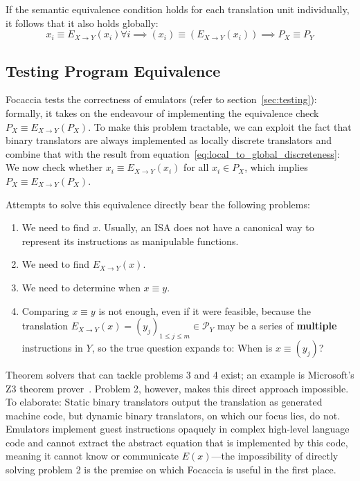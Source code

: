 If the semantic equivalence condition holds for each translation unit individually, it follows that it also holds globally:
\begin{equation}\label{eq:local_to_global_discreteness}
    x_i \equiv E_{X\rightarrow Y}(x_i) \forall i \implies (x_i) \equiv (E_{X\rightarrow Y}(x_i)) \implies P_X \equiv P_Y
\end{equation}

\subsection{Testing Program Equivalence}\label{sec:program_equiv}

Focaccia tests the correctness of emulators (refer to section~\ref{sec:testing}): formally, it takes on the endeavour of
implementing the equivalence check $P_X \equiv E_{X \rightarrow Y}(P_X)$. To make this problem tractable, we can exploit
the fact that binary translators are always implemented as locally discrete translators and combine that with the result
from equation~\ref{eq:local_to_global_discreteness}: We now check whether $x_i \equiv E_{X \rightarrow Y}(x_i)$ for all
$x_i \in P_X$, which implies $P_X \equiv E_{X \rightarrow Y}(P_X)$.

Attempts to solve this equivalence directly bear the following problems:

\begin{enumerate}
    \item We need to find $x$. Usually, an \ac{ISA} does not have a canonical way to represent its instructions as
        manipulable functions.
    \item We need to find $E_{X \rightarrow Y}(x)$.
    \item We need to determine when $x \equiv y$.
    \item Comparing $x \equiv y$ is not enough, even if it were feasible, because the translation $E_{X \rightarrow
        Y}(x) = (y_j)_{1 \leq j \leq m} \in \mathcal{P}_Y$ may be a series of \textbf{multiple} instructions in $Y$, so
        the true question expands to: When is $x \equiv (y_j)$?
\end{enumerate}

Theorem solvers that can tackle problems 3 and 4 exist; an example is Microsoft's Z3 theorem
prover~\cite{Z3prover2024Mar}. Problem 2, however, makes this direct approach impossible. To elaborate: Static binary
translators output the translation as generated machine code, but dynamic binary translators, on which our focus lies,
do not. Emulators implement guest instructions opaquely in complex high-level language code and cannot extract the
abstract equation that is implemented by this code, meaning it cannot know or communicate $E(x)$---the impossibility of
directly solving problem 2 is the premise on which Focaccia is useful in the first place.

